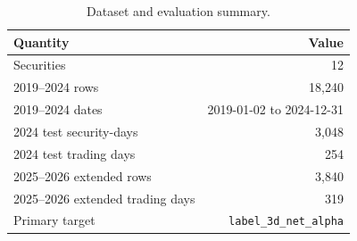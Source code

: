 \begin{table}[t]
\centering
\caption{Dataset and evaluation summary.}
\label{tab:dataset}
\small
\begin{tabular}{@{}lr@{}}
\toprule
Quantity & Value \\
\midrule
Securities & 12 \\
2019--2024 rows & 18,240 \\
2019--2024 dates & 2019-01-02 to 2024-12-31 \\
2024 test security-days & 3,048 \\
2024 test trading days & 254 \\
2025--2026 extended rows & 3,840 \\
2025--2026 extended trading days & 319 \\
Primary target & \texttt{label\_3d\_net\_alpha} \\
\bottomrule
\end{tabular}
\end{table}
